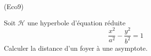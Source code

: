 \begin{tiny}(Eco9)\end{tiny} Soit $\mathcal{H}$ une hyperbole d'équation réduite
\begin{displaymath}
 \frac{x^2}{a^2} - \frac{y^2}{b^2}=1
\end{displaymath}
 Calculer la distance d'un foyer à une asymptote.